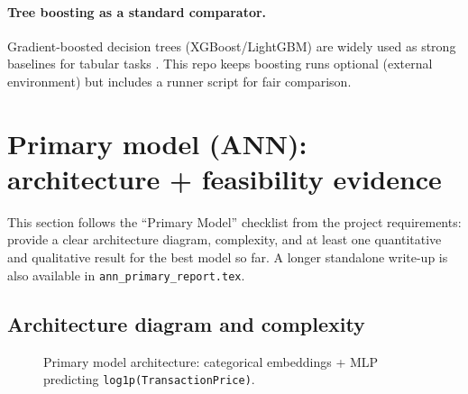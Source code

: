 \documentclass[11pt]{article}
\begin{document}
\paragraph{Tree boosting as a standard comparator.}
Gradient-boosted decision trees (XGBoost/LightGBM) are widely used as strong baselines for tabular tasks \cite{chen2016xgboost,ke2017lightgbm}. This repo keeps boosting runs optional (external environment) but includes a runner script for fair comparison.

\section{Primary model (ANN): architecture + feasibility evidence}
This section follows the ``Primary Model'' checklist from the project requirements: provide a clear architecture diagram, complexity, and at least one quantitative and qualitative result for the best model so far. A longer standalone write-up is also available in \texttt{ann\_primary\_report.tex}.

\subsection{Architecture diagram and complexity}
\begin{figure}[h]
\centering
{}
\caption{Primary model architecture: categorical embeddings + MLP predicting \texttt{log1p(TransactionPrice)}.}
\label{fig:primary-ann-arch}
\end{figure}
\end{document}

